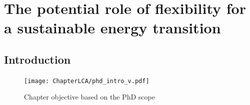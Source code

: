 \chapter{The potential role of flexibility for a sustainable energy transition}
\label{The potential role of flexibility for a sustainable energy transition}
\chaptermark{}

\section{Introduction} \label{Introduction}


\begin{figure}[]
	\centering
	\texttt{[image: ChapterLCA/phd\_intro\_v.pdf]}
		\caption{Chapter objective based on the PhD scope}
	\label{fig:chapter_obj_v}  
\end{figure}

